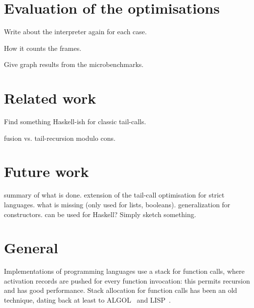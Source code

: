 \documentclass[diploma]{softlab-thesis}
\begin{document}

\chapter {Evaluation of the optimisations }

Write about the interpreter again for each case.

How it counts the frames. 

Give graph results from the microbenchmarks.

\chapter{Related work}

Find something Haskell-ish for classic tail-calls.

fusion vs. tail-recursion modulo cons.


\chapter{Future work}
summary of what is done.
extension of the tail-call optimisation for strict
languages.
what is missing (only used for lists, booleans).
generalization for constructors.
can be used for Haskell? Simply sketch something.









\backmatter

\appendix

\chapter{General}

Implementations of programming languages use a stack for function calls, where activation records are pushed for every function invocation: this permits recursion and has good performance. Stack allocation for function calls has been an old technique, dating back at least to ALGOL~\cite{Dijkstra60,Naur78} and LISP~\cite{McCarthy60,Stoyan79}.
\end{document}
